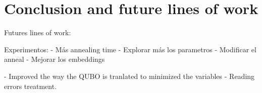 \chapter*{Conclusion and future lines of work}

Futures lines of work:

Experimentos:
	- Más annealing time
	- Explorar más los parametros
	- Modificar el anneal
	- Mejorar los embeddings
	


- Improved the way the QUBO is tranlated to minimized the variables
- Reading errors treatment.